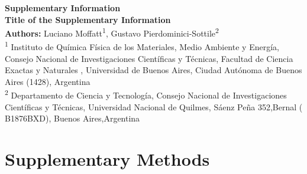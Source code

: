 \documentclass[12pt]{article}
\begin{document}
	
	\begin{center}
		\Large\textbf{Supplementary Information}\\[1em]
		\normalsize
		\textbf{Title of the Supplementary Information}\\[1em]
		\textbf{Authors:} Luciano Moffatt\textsuperscript{1}, Gustavo Pierdominici-Sottile\textsuperscript{2}\\[1em]
		\small
		\textsuperscript{1} Instituto de Qu\'{i}mica F\'{i}sica de los Materiales, Medio Ambiente y Energ\'{i}a, Consejo Nacional de Investigaciones Científicas y T\'{e}cnicas, Facultad de Ciencia Exactas y Naturales , Universidad de Buenos Aires, Ciudad Aut\'{o}noma de Buenos Aires (1428), Argentina\\
		\textsuperscript{2} Departamento de Ciencia y Tecnolog\'{i}a, 
		Consejo Nacional de Investigaciones Científicas y T\'{e}cnicas,  Universidad Nacional de Quilmes, S\'{a}enz Pe\~{n}a 352,Bernal ( B1876BXD), Buenos Aires,Argentina\\
		
	\end{center}
	
	\section*{Supplementary Methods}
	\label{sec:supp-methods}
	\lipsum[1] %
	
\end{document}
